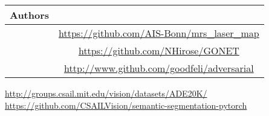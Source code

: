 \begin{tabular}{cc}
	Authors & \acronym{url}\\ 
	\hline\hline
	\citet{Droeschel} & \url{https://github.com/AIS-Bonn/mrs_laser_map}\\
	\citet{HiroseGonet} & \url{https://github.com/NHirose/GONET}\\
	\citet{Goodfellow} & \url{http://www.github.com/goodfeli/adversarial}\\
\end{tabular}

\url{http://groups.csail.mit.edu/vision/datasets/ADE20K/}\\
\url{https://github.com/CSAILVision/semantic-segmentation-pytorch}